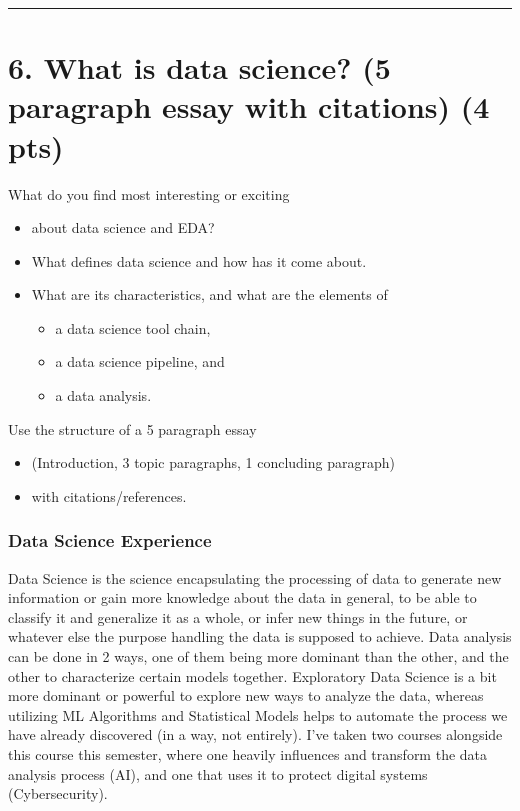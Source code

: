 \documentclass[
]{article}
\providecommand{\tightlist}{%
  \setlength{\itemsep}{0pt}\setlength{\parskip}{0pt}}
\begin{document}
\begin{center}\rule{0.5\linewidth}{0.5pt}\end{center}

\hypertarget{what-is-data-science-5-paragraph-essay-with-citations-4-pts}{%
\section{6. What is data science? (5 paragraph essay with citations) (4
pts)}\label{what-is-data-science-5-paragraph-essay-with-citations-4-pts}}

What do you find most interesting or exciting

\begin{itemize}
\tightlist
\item
  about data science and EDA?
\item
  What defines data science and how has it come about.\\
\item
  What are its characteristics, and what are the elements of

  \begin{itemize}
  \tightlist
  \item
    a data science tool chain,
  \item
    a data science pipeline, and
  \item
    a data analysis.
  \end{itemize}
\end{itemize}

Use the structure of a 5 paragraph essay

\begin{itemize}
\tightlist
\item
  (Introduction, 3 topic paragraphs, 1 concluding paragraph)
\item
  with citations/references.
\end{itemize}

\hypertarget{data-science-experience}{%
\subsubsection{Data Science Experience}\label{data-science-experience}}

Data Science is the science encapsulating the processing of data to
generate new information or gain more knowledge about the data in
general, to be able to classify it and generalize it as a whole, or
infer new things in the future, or whatever else the purpose handling
the data is supposed to achieve. Data analysis can be done in 2 ways,
one of them being more dominant than the other, and the other to
characterize certain models together. Exploratory Data Science is a bit
more dominant or powerful to explore new ways to analyze the data,
whereas utilizing ML Algorithms and Statistical Models helps to automate
the process we have already discovered (in a way, not entirely). I've
taken two courses alongside this course this semester, where one heavily
influences and transform the data analysis process (AI), and one that
uses it to protect digital systems (Cybersecurity).
\end{document}
